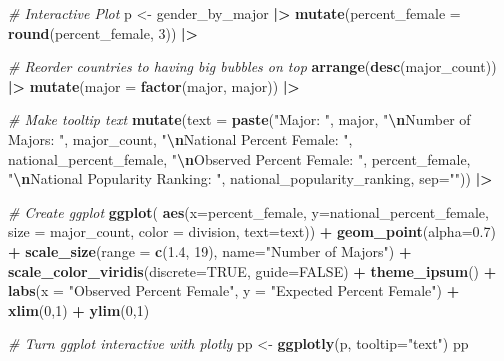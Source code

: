 \documentclass[
  twocolumn]{article}
\newenvironment{Shaded}{\begin{snugshade}}{\end{snugshade}}
\newcommand{\AttributeTok}[1]{\textcolor[rgb]{0.13,0.29,0.53}{#1}}
\newcommand{\CommentTok}[1]{\textcolor[rgb]{0.56,0.35,0.01}{\textit{#1}}}
\newcommand{\ConstantTok}[1]{\textcolor[rgb]{0.56,0.35,0.01}{#1}}
\newcommand{\DecValTok}[1]{\textcolor[rgb]{0.00,0.00,0.81}{#1}}
\newcommand{\FloatTok}[1]{\textcolor[rgb]{0.00,0.00,0.81}{#1}}
\newcommand{\FunctionTok}[1]{\textcolor[rgb]{0.13,0.29,0.53}{\textbf{#1}}}
\newcommand{\NormalTok}[1]{#1}
\newcommand{\OtherTok}[1]{\textcolor[rgb]{0.56,0.35,0.01}{#1}}
\newcommand{\SpecialCharTok}[1]{\textcolor[rgb]{0.81,0.36,0.00}{\textbf{#1}}}
\newcommand{\StringTok}[1]{\textcolor[rgb]{0.31,0.60,0.02}{#1}}
\begin{document}
\begin{Shaded}
\begin{Highlighting}[]
\CommentTok{\# Interactive Plot}
\NormalTok{p }\OtherTok{\textless{}{-}}\NormalTok{ gender\_by\_major }\SpecialCharTok{|\textgreater{}}
  \FunctionTok{mutate}\NormalTok{(}\AttributeTok{percent\_female =} \FunctionTok{round}\NormalTok{(percent\_female, }\DecValTok{3}\NormalTok{)) }\SpecialCharTok{|\textgreater{}}
  
  \CommentTok{\# Reorder countries to having big bubbles on top}
  \FunctionTok{arrange}\NormalTok{(}\FunctionTok{desc}\NormalTok{(major\_count)) }\SpecialCharTok{|\textgreater{}}
  \FunctionTok{mutate}\NormalTok{(}\AttributeTok{major =} \FunctionTok{factor}\NormalTok{(major, major)) }\SpecialCharTok{|\textgreater{}}
  
  \CommentTok{\# Make tooltip text}
  \FunctionTok{mutate}\NormalTok{(}\AttributeTok{text =} \FunctionTok{paste}\NormalTok{(}\StringTok{"Major: "}\NormalTok{, major, }\StringTok{"}\SpecialCharTok{\textbackslash{}n}\StringTok{Number of Majors: "}\NormalTok{, major\_count, }\StringTok{"}\SpecialCharTok{\textbackslash{}n}\StringTok{National Percent Female: "}\NormalTok{, national\_percent\_female, }\StringTok{"}\SpecialCharTok{\textbackslash{}n}\StringTok{Observed Percent Female: "}\NormalTok{, percent\_female, }\StringTok{"}\SpecialCharTok{\textbackslash{}n}\StringTok{National Popularity Ranking: "}\NormalTok{, national\_popularity\_ranking, }\AttributeTok{sep=}\StringTok{""}\NormalTok{)) }\SpecialCharTok{|\textgreater{}}
  
  \CommentTok{\# Create ggplot}
  \FunctionTok{ggplot}\NormalTok{( }\FunctionTok{aes}\NormalTok{(}\AttributeTok{x=}\NormalTok{percent\_female,}
              \AttributeTok{y=}\NormalTok{national\_percent\_female,}
              \AttributeTok{size =}\NormalTok{ major\_count,}
              \AttributeTok{color =}\NormalTok{ division,}
              \AttributeTok{text=}\NormalTok{text)) }\SpecialCharTok{+}
  \FunctionTok{geom\_point}\NormalTok{(}\AttributeTok{alpha=}\FloatTok{0.7}\NormalTok{) }\SpecialCharTok{+}
  \FunctionTok{scale\_size}\NormalTok{(}\AttributeTok{range =} \FunctionTok{c}\NormalTok{(}\FloatTok{1.4}\NormalTok{, }\DecValTok{19}\NormalTok{), }\AttributeTok{name=}\StringTok{"Number of Majors"}\NormalTok{) }\SpecialCharTok{+}
  \FunctionTok{scale\_color\_viridis}\NormalTok{(}\AttributeTok{discrete=}\ConstantTok{TRUE}\NormalTok{, }\AttributeTok{guide=}\ConstantTok{FALSE}\NormalTok{) }\SpecialCharTok{+}
  \FunctionTok{theme\_ipsum}\NormalTok{() }\SpecialCharTok{+}
  \FunctionTok{labs}\NormalTok{(}\AttributeTok{x =} \StringTok{"Observed Percent Female"}\NormalTok{,}
       \AttributeTok{y =} \StringTok{"Expected Percent Female"}\NormalTok{) }\SpecialCharTok{+}
  \FunctionTok{xlim}\NormalTok{(}\DecValTok{0}\NormalTok{,}\DecValTok{1}\NormalTok{) }\SpecialCharTok{+}
  \FunctionTok{ylim}\NormalTok{(}\DecValTok{0}\NormalTok{,}\DecValTok{1}\NormalTok{)}

\CommentTok{\# Turn ggplot interactive with plotly}
\NormalTok{pp }\OtherTok{\textless{}{-}} \FunctionTok{ggplotly}\NormalTok{(p, }\AttributeTok{tooltip=}\StringTok{"text"}\NormalTok{)}
\NormalTok{pp}
\end{Highlighting}
\end{Shaded}
\end{document}
